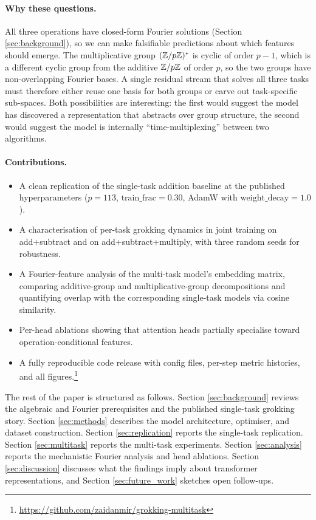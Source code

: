 \paragraph{Why these questions.}
All three operations have closed-form Fourier solutions (Section
\ref{sec:background}), so we can make falsifiable predictions about which
features should emerge. The multiplicative group $(\mathbb{Z}/p\mathbb{Z})^*$ is cyclic of
order $p - 1$, which is a different cyclic group from the additive
$\mathbb{Z}/p\mathbb{Z}$ of order $p$, so the two groups have non-overlapping Fourier
bases. A single residual stream that solves all three tasks must therefore
either reuse one basis for both groups or carve out task-specific
sub-spaces. Both possibilities are interesting: the first would suggest
the model has discovered a representation that abstracts over group
structure, the second would suggest the model is internally
``time-multiplexing'' between two algorithms.

\paragraph{Contributions.}
\begin{itemize}
\item A clean replication of the \citet{nanda2023progress} single-task
      addition baseline at the published hyperparameters
      ($p = 113$, $\mathrm{train\_frac} = 0.30$, AdamW with
      $\mathrm{weight\_decay} = 1.0$).
\item A characterisation of per-task grokking dynamics in joint training
      on add+subtract and on add+subtract+multiply, with three random
      seeds for robustness.
\item A Fourier-feature analysis of the multi-task model's embedding
      matrix, comparing additive-group and multiplicative-group
      decompositions and quantifying overlap with the corresponding
      single-task models via cosine similarity.
\item Per-head ablations showing that attention heads partially
      specialise toward operation-conditional features.
\item A fully reproducible code release with config files, per-step
      metric histories, and all figures.\footnote{%
      \url{https://github.com/zaidanmir/grokking-multitask}}
\end{itemize}

The rest of the paper is structured as follows. Section
\ref{sec:background} reviews the algebraic and Fourier prerequisites and
the published single-task grokking story. Section \ref{sec:methods}
describes the model architecture, optimiser, and dataset construction.
Section \ref{sec:replication} reports the single-task replication.
Section \ref{sec:multitask} reports the multi-task experiments. Section
\ref{sec:analysis} reports the mechanistic Fourier analysis and head
ablations. Section \ref{sec:discussion} discusses what the findings imply
about transformer representations, and Section \ref{sec:future_work}
sketches open follow-ups.
